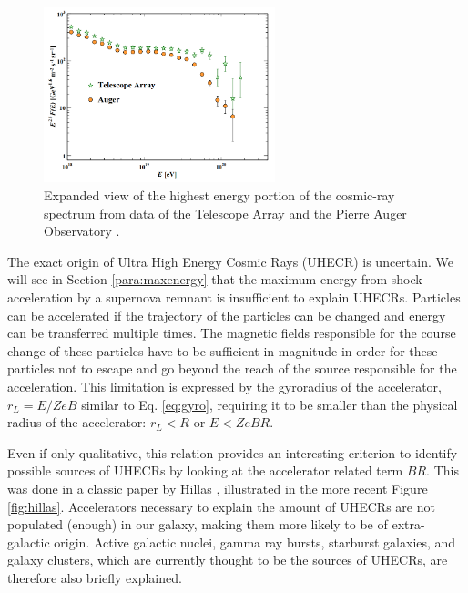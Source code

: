 \begin{figure}
\centering
\includegraphics[width=0.6\textwidth]{chapter3/img/ankle.png}
\caption{Expanded view of the highest energy portion of the cosmic-ray spectrum from data of the Telescope Array and the Pierre Auger Observatory \cite{PDG2018url}.}
\label{fig:ankle}
\end{figure}

\noindent The exact origin of Ultra High Energy Cosmic Rays (UHECR) is uncertain. We will see in Section \ref{para:maxenergy} that the maximum energy from shock acceleration by a supernova remnant is insufficient to explain UHECRs. Particles can be accelerated if the trajectory of the particles can be changed and energy can be transferred multiple times. The magnetic fields responsible for the course change of these particles have to be sufficient in magnitude in order for these particles not to escape and go beyond the reach of the source responsible for the acceleration. This limitation is expressed by the gyroradius of the accelerator, $r_L = E/ZeB$ similar to Eq. \ref{eq:gyro}, requiring it to be smaller than the physical radius of the accelerator: $r_L < R$ or $E < ZeBR$.

Even if only qualitative, this relation provides an interesting criterion to identify possible sources of UHECRs by looking at the accelerator related term $BR$. This was done in a classic paper by Hillas \cite{Hillas:1985is}, illustrated in the more recent Figure \ref{fig:hillas}. Accelerators necessary to explain the amount of UHECRs are not populated (enough) in our galaxy, making them more likely to be of extra-galactic origin. Active galactic nuclei, gamma ray bursts, starburst galaxies, and galaxy clusters, which are currently thought to be the sources of UHECRs, are therefore also briefly explained.

